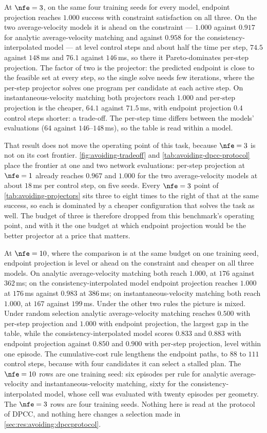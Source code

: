 At $\nfe=3$, on the same four training seeds for every model, endpoint projection reaches $1.000$ success
with constraint satisfaction on all three. On the two average-velocity models it is ahead on the
constraint --- $1.000$ against $0.917$ for analytic average-velocity matching and against $0.958$ for the
consistency-interpolated model --- at level control steps and about half the time per step, $74.5$ against
$148$\,ms and $76.1$ against $146$\,ms, so there it Pareto-dominates per-step projection. The factor of two
is the projector: the predicted endpoint is close to the feasible set at every step, so the single solve
needs few iterations, where the per-step projector solves one program per candidate at each active step.
On instantaneous-velocity matching both projectors reach $1.000$ and per-step projection is the cheaper,
$64.1$ against $71.5$\,ms, with endpoint projection $0.4$ control steps shorter: a trade-off. The per-step
time differs between the models' evaluations ($64$ against $146$--$148$\,ms), so the table is read within
a model.

That result does not move the operating point of this task, because $\nfe=3$ is not on its cost frontier.
\autoref{fig:avoiding-tradeoff} and \autoref{tab:avoiding-dpcc-protocol} place the frontier at one and
two network evaluations: per-step projection at $\nfe=1$ already reaches $0.967$ and $1.000$ for the two
average-velocity models at about $18$\,ms per control step, on five seeds. Every $\nfe=3$ point of
\autoref{tab:avoiding-projectors} sits three to eight times to the right of that at the same success, so
each is dominated by a cheaper configuration that solves the task as well. The budget of three is
therefore dropped from this benchmark's operating point, and with it the one budget at which endpoint
projection would be the better projector at a price that matters.

At $\nfe=10$, where the comparison is at the same budget on one training seed, endpoint projection is level
or ahead on the constraint and cheaper on all three models. On analytic average-velocity matching both reach
$1.000$, at $176$ against $362$\,ms; on the consistency-interpolated model endpoint projection reaches
$1.000$ at $176$\,ms against $0.983$ at $386$\,ms; on instantaneous-velocity matching both reach $1.000$, at
$167$ against $199$\,ms. Under the other two rules the picture is mixed. Under random selection analytic
average-velocity matching reaches $0.500$ with per-step projection and $1.000$ with endpoint projection, the
largest gap in the table, while the consistency-interpolated model scores $0.833$ and $0.883$ with endpoint
projection against $0.850$ and $0.900$ with per-step projection, level within one episode. The
cumulative-cost rule lengthens the endpoint paths, to $88$ to $111$ control steps, because with four
candidates it can select a stalled plan. The $\nfe=10$ rows are one training seed: six episodes per
rule for analytic average-velocity and instantaneous-velocity matching, sixty for the consistency-interpolated
model, whose cell was evaluated with twenty episodes per geometry. The $\nfe=3$ rows are four training
seeds. Nothing here is read at the protocol of \ac{DPCC}, and nothing here changes a selection made in
\autoref{sec:res:avoiding:dpccprotocol}.

